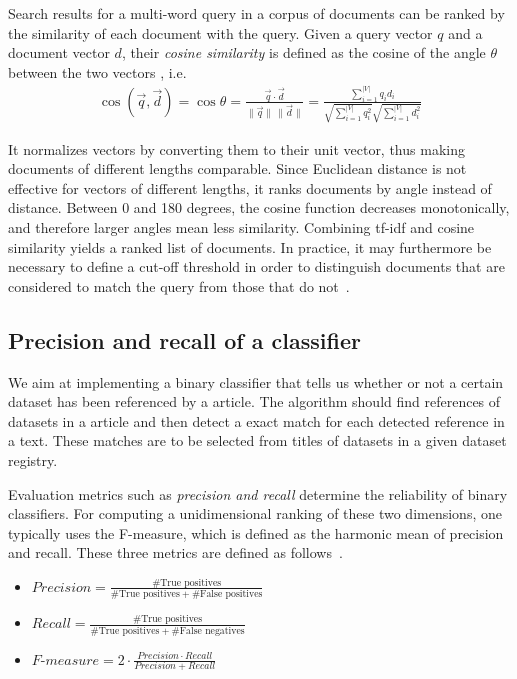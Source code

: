 \documentclass{IOS-Book-Article}
\begin{document}
Search results for a multi-word query in a corpus of documents can be ranked by the similarity of each document with the query.
Given a query vector $q$ and a document vector $d$, their \emph{cosine similarity} is defined as the cosine of the angle $\theta$ between the two vectors \citep{SALTON1988,ChristopherD1999}, i.e.\
\begin{align*}
  \cos(\overrightarrow{q},\overrightarrow{d})=\cos \theta=\frac{\overrightarrow{q}\cdot \overrightarrow{d}}{\|\overrightarrow{q}\|\,\|\overrightarrow{d}\|}=
  \frac{\sum_{i=1}^{|V|} q_id_i}{\sqrt{\sum_{i=1}^{|V|} q_i^2}\sqrt{\sum_{i=1}^{|V|} d_i^2}}
\end{align*}

It normalizes vectors by converting them to their unit vector, thus making documents of different lengths comparable.
Since Euclidean distance is not effective for vectors of different lengths, it ranks documents by angle instead of distance.
Between 0 and 180 degrees, the cosine function decreases monotonically, and therefore larger angles mean less similarity.
Combining tf-idf and cosine similarity yields a ranked list of documents.
In practice, it may furthermore be necessary to define a cut-off threshold in order to distinguish documents that are considered to match the query from those that do not~\citep{Joachims1997}.

\subsection{Precision and recall of a classifier}
\label{sec:precision-recall}
We aim at implementing a binary classifier that tells us whether or not a certain dataset has been referenced by a article.
The algorithm should find references of datasets in a article and then detect a exact match for each detected reference in a text.
These matches are to be selected from titles of datasets in a given dataset registry.

Evaluation metrics such as \emph{precision and recall} determine the reliability of binary classifiers.
For computing a unidimensional ranking of these two dimensions, one typically uses the F-measure, which is defined as the harmonic mean of precision and recall. 
These three metrics are defined as follows~\cite{Powers2011}. 
\begin{itemize}
	\item $\mathit{Precision}=\frac{\#\text{True\ positives}}{\#\text{True positives}+\#\text{False positives}}$
	\item $\mathit{Recall}=\frac{\#\text{True positives}}{\#\text{True positives}+\#\text{False negatives}}$
	\item $\textit{F-measure}=2\cdot{\frac{\mathit{Precision}\cdot\mathit{Recall}}{\mathit{Precision}+\mathit{Recall}}}$
\end{itemize}
\end{document}
